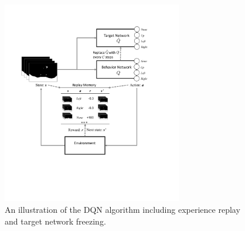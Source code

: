 \documentclass[xcolor={table}]{beamer}
\begin{document}
 \begin{frame}[plain]
\begin{figure}[!tbh]
\begin{center}
\includegraphics[width=0.7\textwidth]{./images/fmlpda_figure_11_9.pdf}
\end{center}
\caption{An illustration of the DQN algorithm including experience replay and target network freezing.}
\label{fig:rl_dqn_architecture_detailed}
\end{figure}
\end{frame} 
\end{document}

